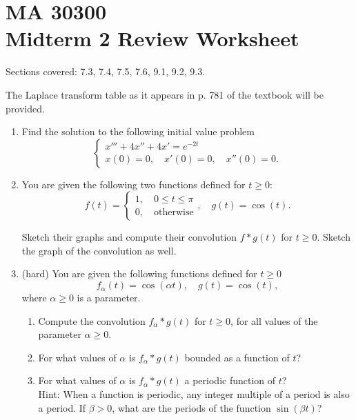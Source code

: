 \documentclass[11 pt]{article}
\title{}
\author{Nikolas Eptaminitakis}
\renewcommand{\a}{\alpha}
\renewcommand{\b}{\beta}
\newcommand{\NI}{\noindent}
\begin{document}
\section*{MA 30300 \\Midterm 2 Review Worksheet}

\NI Sections covered: 7.3, 7.4, 7.5, 7.6, 9.1, 9.2, 9.3.

\NI The Laplace transform table as it appears in p. 781 of the textbook will be provided.

\begin{enumerate}
    \item Find the solution to the following initial value problem
    \begin{equation}
        \begin{cases}
          x'''+4x''+4x'=e^{-2t}\\
          x(0)=0,\quad x'(0)=0, \quad x''(0)=0.  
        \end{cases}
    \end{equation}





\item You are given the following two functions defined for $t\geq 0$:
\begin{equation}
    f(t)=\begin{cases}
        1, \quad 0\leq t\leq\pi\\
        0, \quad \text{otherwise}
    \end{cases}, \quad g(t)=\cos(t).
\end{equation}

Sketch their graphs and compute their convolution $f*g(t)$ for $t\geq 0$. Sketch the graph of the convolution as well.



\item (hard) You are given the following functions defined for $t\geq 0 $
\begin{equation}
    f_\a(t)=\cos(\a t),\quad g(t)=\cos( t),
\end{equation}
where $\a\geq 0$ is a parameter.  
\begin{enumerate}
    \item Compute the convolution $f_\a*g(t)$ for $t\geq 0$, for all values of the parameter $\a\geq  0$.
    \item For what values of $\a$ is $f_\a*g(t)$ bounded as a function of $t$?
    \item For what values of $\a$ is $f_\a*g(t)$ a periodic function of $t$? \\
Hint: When a function is periodic, any integer multiple of a period is also a period. If $\b>0$, what are the periods of the function $\sin(\b t)$?
\end{enumerate}



\end{enumerate}
\end{document}
